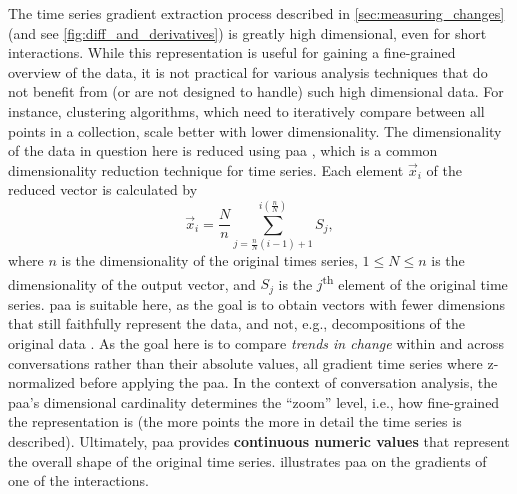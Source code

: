 The time series gradient extraction process described in \cref{sec:measuring_changes} (and see \cref{fig:diff_and_derivatives}) is greatly high dimensional, even for short interactions.
While this representation is useful for gaining a fine-grained overview of the data, it is not practical for various analysis techniques that do not benefit from (or are not designed to handle) such high dimensional data.
For instance, clustering algorithms, which need to iteratively compare between all points in a collection, scale better with lower dimensionality.
The dimensionality of the data in question here is reduced using \acf{paa} \citep{Keogh2001dimensionality}, which is a common dimensionality reduction technique for time series.
Each element $\vec{x}_i$ of the reduced vector is calculated by
%
\begin{equation}
	\label{eq:paa}
	\vec{x}_i = \frac{N}{n} \sum_{j=\frac{n}{N}(i-1)+1}^{i(\frac{n}{N})} S_j,
\end{equation}
\noindent
%
where $n$ is the dimensionality of the original times series, $1 \leq N \leq n$ is the dimensionality of the output vector, and $S_j$ is the $j$\textsuperscript{th} element of the original time series.
\Ac{paa} is suitable here, as the goal is to obtain vectors with fewer dimensions that still faithfully represent the data, and not, e.g., decompositions of the original data \citep[cf.\ method survey in][pp.\ 271-275]{Keogh2001dimensionality}.
As the goal here is to compare \emph{trends in change} within and across conversations rather than their absolute values, all gradient time series where z-normalized before applying the \ac{paa}.
In the context of conversation analysis, the \ac{paa}'s dimensional cardinality determines the \enquote{zoom} level, i.e., how fine-grained the representation is (the more points the more in detail the time series is described).
Ultimately, \ac{paa} provides \textbf{continuous numeric values} that represent the overall shape of the original time series.
 illustrates \ac{paa} on the gradients of one of the interactions.


